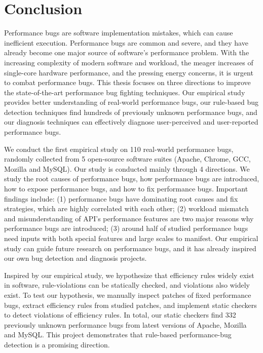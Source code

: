 \chapter[Conclusion]{Conclusion}
\label{chap:con}

Performance bugs are software implementation mistakes, which can cause inefficient execution. 
Performance bugs are common and severe, and they have already become one major source of software's performance problem. 
With the increasing complexity
of modern software and workload, the meager increases of single-core hardware performance, and the pressing energy concerns, 
it is urgent to combat performance bugs. 
This thesis focuses on three directions to improve the state-of-the-art performance bug fighting techniques. 
Our empirical study provides better understanding of real-world performance bugs, 
our rule-based bug detection techniques find hundreds of previously unknown performance bugs, 
and our diagnosis techniques can effectively diagnose user-perceived and user-reported performance bugs. 

We conduct the first empirical study on 110 real-world performance bugs, 
randomly collected from 5 open-source software suites 
(Apache, Chrome, GCC, Mozilla and MySQL). 
Our study is conducted mainly through 4 directions. 
We study the root causes of performance bugs, 
how performance bugs are introduced, 
how to expose performance bugs, 
and how to fix performance bugs. 
Important findings include: 
(1) performance bugs have dominating root causes and fix strategies, 
which are highly correlated with each other; 
(2) workload mismatch and misunderstanding of API's performance features 
are two major reasons why performance bugs are introduced; 
(3) around half of studied performance bugs need inputs with both special features 
and large scales to manifest. 
Our empirical study can guide future research on performance bugs, 
and it has already inspired our own bug detection and diagnosis projects. 

Inspired by our empirical study, 
we hypothesize that efficiency rules widely exist in software, 
rule-violations can be statically checked, and violations also widely exist. 
To test our hypothesis, we manually inspect patches of fixed performance bugs, 
extract efficiency rules from studied patches, 
and implement static checkers to detect violations of efficiency rules. 
In total, our static checkers find 332 previously unknown performance bugs from latest versions of Apache, Mozilla and MySQL. 
This project demonstrates that rule-based performance-bug detection is a promising direction. 

